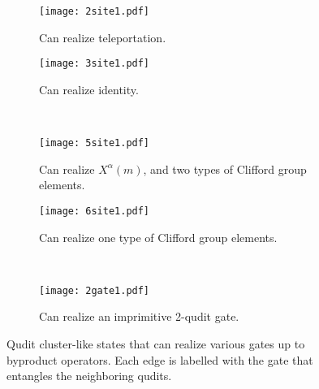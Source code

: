 \documentclass[aps,amsfonts,pra,twocolumn,showpacs]{revtex4-1}
\begin{document}
	\begin{figure}
		\centering
		\begin{subfigure}[t]{0.45\textwidth}
			\centering
			\texttt{[image: 2site1.pdf]}
			\caption{Can realize teleportation. \label{teleportation1}}
		\end{subfigure}
		\hspace{2mm}
		\begin{subfigure}[t]{0.45\textwidth}
			\centering
			\texttt{[image: 3site1.pdf]}
			\caption{Can realize identity. \label{identity1}}
		\end{subfigure} \\
		\vspace{10mm}
		\begin{subfigure}[t]{0.45\textwidth}
			\centering
			\texttt{[image: 5site1.pdf]}
			\caption{Can realize $X^\alpha(m)$, and two types of Clifford group elements. \label{5sites1}}
		\end{subfigure}
		\hspace{2mm}
		\begin{subfigure}[t]{0.45\textwidth}
			\centering
			\texttt{[image: 6site1.pdf]}
			\caption{Can realize one type of Clifford group elements. \label{6sites1}}
		\end{subfigure} \\
		\vspace{10mm}
		\begin{subfigure}[t]{0.45\textwidth}
			\centering
			\texttt{[image: 2gate1.pdf]}
			\caption{Can realize an imprimitive 2-qudit gate. \label{2gate1}}
		\end{subfigure}
		\caption{Qudit cluster-like states that can realize various gates up to byproduct operators. Each edge is labelled with the gate that entangles the neighboring qudits.}
	\end{figure}
	
\end{document}
